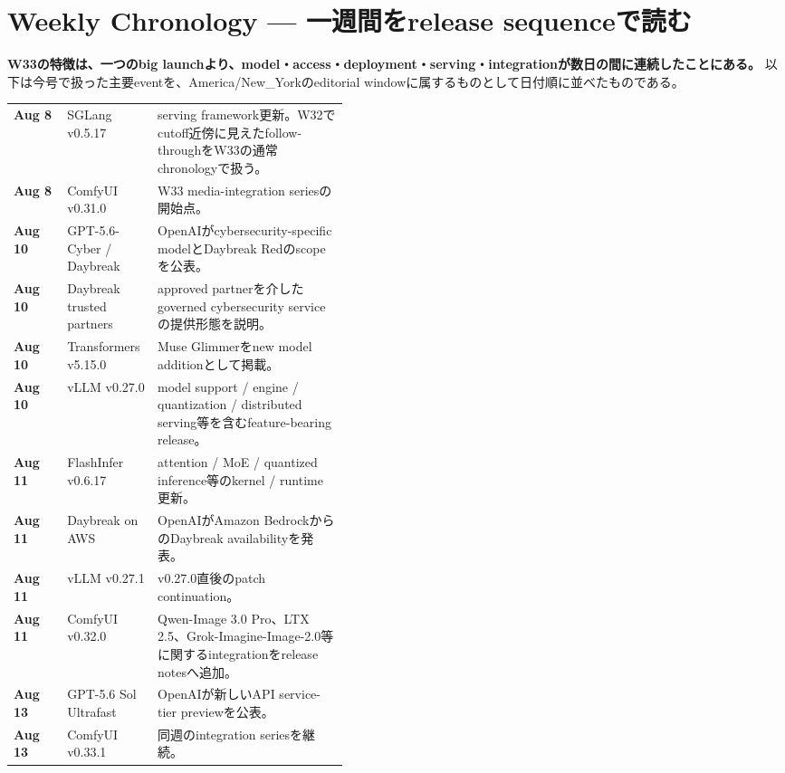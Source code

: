 \section{Weekly Chronology --- 一週間をrelease sequenceで読む}
\label{sec:chronology}

\textbf{W33の特徴は、一つのbig launchより、model・access・deployment・serving・integrationが数日の間に連続したことにある。} 以下は今号で扱った主要eventを、America/New\_Yorkのeditorial windowに属するものとして日付順に並べたものである。

\begin{center}
\small
\begin{tabularx}{0.98\linewidth}{@{}>{\bfseries}p{0.16\linewidth}p{0.27\linewidth}X@{}}
Aug 8 & SGLang v0.5.17 & serving framework更新。W32でcutoff近傍に見えたfollow-throughをW33の通常chronologyで扱う\cite{sglang-0517-w33}。 \\
Aug 8 & ComfyUI v0.31.0 & W33 media-integration seriesの開始点\cite{comfyui-0310}。 \\
Aug 10 & GPT-5.6-Cyber / Daybreak & OpenAIがcybersecurity-specific modelとDaybreak Redのscopeを公表\cite{openai-daybreak-cyber}。 \\
Aug 10 & Daybreak trusted partners & approved partnerを介したgoverned cybersecurity serviceの提供形態を説明\cite{openai-daybreak-partners}。 \\
Aug 10 & Transformers v5.15.0 & Muse Glimmerをnew model additionとして掲載\cite{hf-transformers-515}。 \\
Aug 10 & vLLM v0.27.0 & model support / engine / quantization / distributed serving等を含むfeature-bearing release\cite{vllm-0270}。 \\
Aug 11 & FlashInfer v0.6.17 & attention / MoE / quantized inference等のkernel / runtime更新\cite{flashinfer-0617}。 \\
Aug 11 & Daybreak on AWS & OpenAIがAmazon BedrockからのDaybreak availabilityを発表\cite{openai-daybreak-aws}。 \\
Aug 11 & vLLM v0.27.1 & v0.27.0直後のpatch continuation\cite{vllm-0271}。 \\
Aug 11 & ComfyUI v0.32.0 & Qwen-Image 3.0 Pro、LTX 2.5、Grok-Imagine-Image-2.0等に関するintegrationをrelease notesへ追加\cite{comfyui-0320}。 \\
Aug 13 & GPT-5.6 Sol Ultrafast & OpenAIが新しいAPI service-tier previewを公表\cite{openai-ultrafast}。 \\
Aug 13 & ComfyUI v0.33.1 & 同週のintegration seriesを継続\cite{comfyui-0331}。 \\
\end{tabularx}
\end{center}

